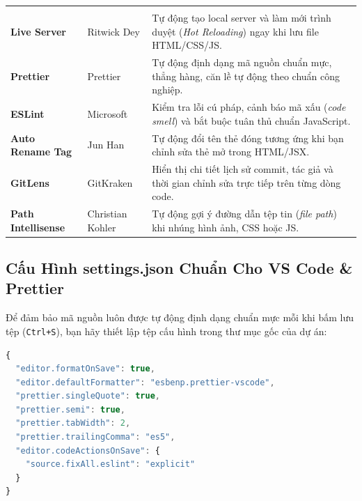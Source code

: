 \begin{prettyTableBox}
\begin{tabularx}{\linewidth}{>{\bfseries\color{primaryBlue}}C{3.2cm} K{2.8cm} Z}
 &  &  \\
Live Server & Ritwick Dey & Tự động tạo local server và làm mới trình duyệt (\textit{Hot Reloading}) ngay khi lưu file HTML/CSS/JS. \\
Prettier & Prettier & Tự động định dạng mã nguồn chuẩn mực, thẳng hàng, căn lề tự động theo chuẩn công nghiệp. \\
ESLint & Microsoft & Kiểm tra lỗi cú pháp, cảnh báo mã xấu (\textit{code smell}) và bắt buộc tuân thủ chuẩn JavaScript. \\
Auto Rename Tag & Jun Han & Tự động đổi tên thẻ đóng tương ứng khi bạn chỉnh sửa thẻ mở trong HTML/JSX. \\
GitLens & GitKraken & Hiển thị chi tiết lịch sử commit, tác giả và thời gian chỉnh sửa trực tiếp trên từng dòng code. \\
Path Intellisense & Christian Kohler & Tự động gợi ý đường dẫn tệp tin (\textit{file path}) khi nhúng hình ảnh, CSS hoặc JS. \\
\end{tabularx}
\end{prettyTableBox}

\subsection{Cấu Hình settings.json Chuẩn Cho VS Code \& Prettier}

Để đảm bảo mã nguồn luôn được tự động định dạng chuẩn mực mỗi khi bấm lưu tệp (\texttt{Ctrl+S}), bạn hãy thiết lập tệp cấu hình  trong thư mục gốc của dự án:

\begin{codeWindow}
\begin{lstlisting}[language=JavaScript]
{
  "editor.formatOnSave": true,
  "editor.defaultFormatter": "esbenp.prettier-vscode",
  "prettier.singleQuote": true,
  "prettier.semi": true,
  "prettier.tabWidth": 2,
  "prettier.trailingComma": "es5",
  "editor.codeActionsOnSave": {
    "source.fixAll.eslint": "explicit"
  }
}
\end{lstlisting}
\end{codeWindow}

